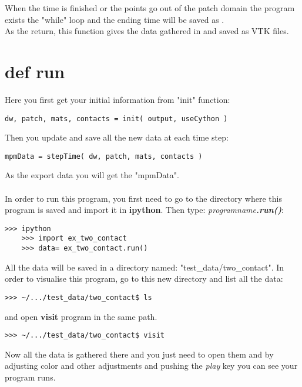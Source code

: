 \documentclass[11pt,fleqn]{book} %
\begin{document}
When the time is finished or the points go out of the patch domain the program exists the "while" loop and the ending time will be saved as .\\
As the return, this function gives the data gathered in  and saved as VTK files.
\section{def run}
Here you first get your initial information from "init" function:
\begin{lstlisting}
dw, patch, mats, contacts = init( output, useCython )
\end{lstlisting}
Then you update and save all the new data at each time step:
\begin{lstlisting}
mpmData = stepTime( dw, patch, mats, contacts )
\end{lstlisting}

As the export data you will get the "mpmData".\\ \\ 


In order to run this program, you first need to go to the directory where this program is saved and import it in \textbf{ipython}. Then type: \emph{programname}\textbf{\emph{.run()}}:
\begin{lstlisting}
>>> ipython
	>>> import ex_two_contact
	>>> data= ex_two_contact.run()
\end{lstlisting}
All the data will be saved in a directory named: "test\_data/two\_contact". In order to visualise this program, go to this new directory and list all the data:
\begin{lstlisting}
>>> ~/.../test_data/two_contact$ ls
\end{lstlisting}
and open \textbf{visit} program in the same path. 
\begin{lstlisting}
>>> ~/.../test_data/two_contact$ visit
\end{lstlisting}
Now all the data is gathered there and you just need to open them and by adjusting color and other adjustments and pushing the \emph{play} key you can see your program runs. 
\end{document}
